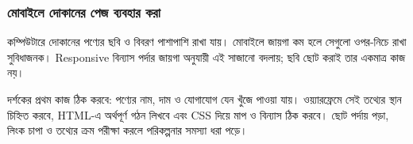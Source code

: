 \subsubsection{মোবাইলে দোকানের পেজ ব্যবহার করা}
কম্পিউটারে দোকানের পণ্যের ছবি ও বিবরণ পাশাপাশি রাখা যায়। মোবাইলে জায়গা কম হলে সেগুলো ওপর-নিচে রাখা সুবিধাজনক। Responsive বিন্যাস পর্দার জায়গা অনুযায়ী এই সাজানো বদলায়; ছবি ছোট করাই তার একমাত্র কাজ নয়।

দর্শকের প্রথম কাজ ঠিক করবে: পণ্যের নাম, দাম ও যোগাযোগ যেন খুঁজে পাওয়া যায়। ওয়্যারফ্রেমে সেই তথ্যের স্থান চিহ্নিত করবে, HTML-এ অর্থপূর্ণ গঠন লিখবে এবং CSS দিয়ে মাপ ও বিন্যাস ঠিক করবে। ছোট পর্দায় পড়া, লিংক চাপা ও তথ্যের ক্রম পরীক্ষা করলে পরিকল্পনার সমস্যা ধরা পড়ে।
